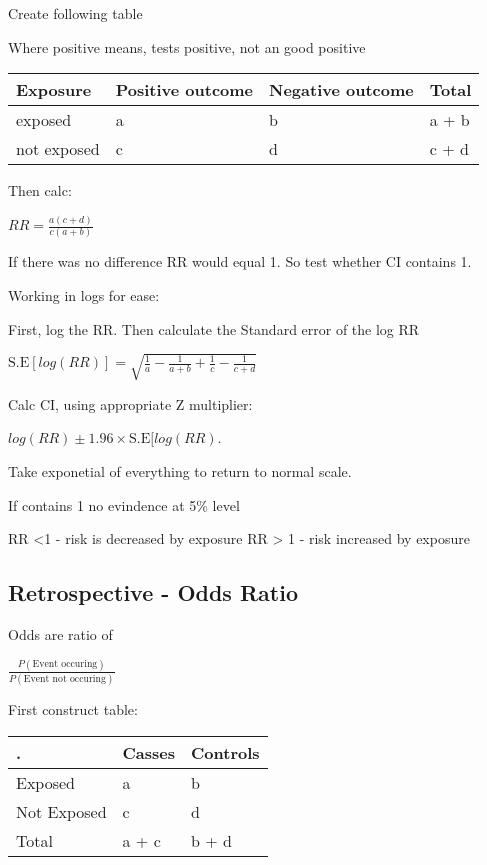 \documentclass[
  letterpaper,
  DIV=11,
  numbers=noendperiod]{scrreprt}
\begin{document}
Create following table

Where positive means, tests positive, not an good positive

\begin{longtable}[]{@{}llll@{}}
\toprule()
Exposure & Positive outcome & Negative outcome & Total \\
\midrule()
\endhead
exposed & a & b & a + b \\
not exposed & c & d & c + d \\
\bottomrule()
\end{longtable}

Then calc:

\(RR = \frac{a(c+d)}{c(a+b)}\)

If there was no difference RR would equal 1. So test whether CI contains
1.

Working in logs for ease:

First, log the RR. Then calculate the Standard error of the log RR

\(\text{S.E}[log(RR)] = \sqrt{  \frac{1}{a} -  \frac{1}{a+b}+  \frac{1}{c}-  \frac{1}{c+d} }\)

Calc CI, using appropriate Z multiplier:

\(log(RR) \pm 1.96 \times \text{S.E}[log(RR)\).

Take exponetial of everything to return to normal scale.

If contains 1 no evindence at 5\% level

RR \textless1 - risk is decreased by exposure RR \textgreater{} 1 - risk
increased by exposure

\hypertarget{retrospective---odds-ratio}{%
\subsection{Retrospective - Odds
Ratio}\label{retrospective---odds-ratio}}

Odds are ratio of

\(\frac{P(\text{Event occuring})}{P(\text{Event not occuring})}\)

First construct table:

\begin{longtable}[]{@{}lll@{}}
\toprule()
. & Casses & Controls \\
\midrule()
\endhead
Exposed & a & b \\
Not Exposed & c & d \\
Total & a + c & b + d \\
\bottomrule()
\end{longtable}
\end{document}
